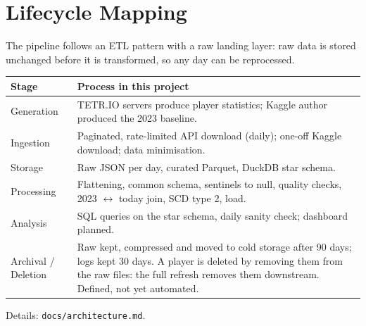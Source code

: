 \documentclass[11pt,a4paper]{article}
\begin{document}
\section{Lifecycle Mapping}\label{sec:lifecycle}
The pipeline follows an ETL pattern with a raw landing layer: raw data is
stored unchanged before it is transformed, so any day can be reprocessed.
\begin{center}
\small
\begin{tabularx}{\textwidth}{@{}p{2.6cm}Y@{}}
\toprule
\textbf{Stage} & \textbf{Process in this project} \\
\midrule
Generation & TETR.IO servers produce player statistics; Kaggle author produced the 2023 baseline. \\
Ingestion & Paginated, rate-limited API download (daily); one-off Kaggle download; data minimisation. \\
Storage & Raw JSON per day, curated Parquet, DuckDB star schema. \\
Processing & Flattening, common schema, sentinels to null, quality checks, 2023 $\leftrightarrow$ today join, SCD type 2, load. \\
Analysis & SQL queries on the star schema, daily sanity check; dashboard planned. \\
Archival / Deletion & Raw kept, compressed and moved to cold storage after 90 days; logs kept 30 days. A player is deleted by removing them from the raw files: the full refresh removes them downstream. Defined, not yet automated. \\
\bottomrule
\end{tabularx}
\end{center}
Details: \texttt{docs/architecture.md}.

\end{document}
